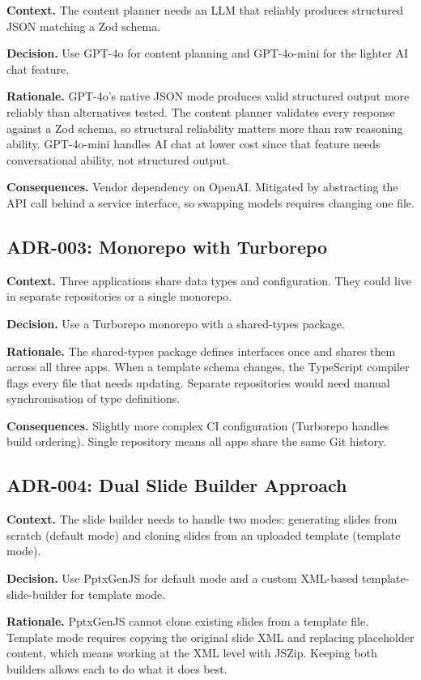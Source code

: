 \textbf{Context.} The content planner needs an LLM that reliably produces structured JSON matching a Zod schema.

\textbf{Decision.} Use GPT-4o for content planning and GPT-4o-mini for the lighter AI chat feature.

\textbf{Rationale.} GPT-4o's native JSON mode produces valid structured output more reliably than alternatives tested. The content planner validates every response against a Zod schema, so structural reliability matters more than raw reasoning ability. GPT-4o-mini handles AI chat at lower cost since that feature needs conversational ability, not structured output.

\textbf{Consequences.} Vendor dependency on OpenAI. Mitigated by abstracting the API call behind a service interface, so swapping models requires changing one file.

\subsection*{ADR-003: Monorepo with Turborepo}

\textbf{Context.} Three applications share data types and configuration. They could live in separate repositories or a single monorepo.

\textbf{Decision.} Use a Turborepo monorepo with a shared-types package.

\textbf{Rationale.} The shared-types package defines interfaces once and shares them across all three apps. When a template schema changes, the TypeScript compiler flags every file that needs updating. Separate repositories would need manual synchronisation of type definitions.

\textbf{Consequences.} Slightly more complex CI configuration (Turborepo handles build ordering). Single repository means all apps share the same Git history.

\subsection*{ADR-004: Dual Slide Builder Approach}

\textbf{Context.} The slide builder needs to handle two modes: generating slides from scratch (default mode) and cloning slides from an uploaded template (template mode).

\textbf{Decision.} Use PptxGenJS for default mode and a custom XML-based template-slide-builder for template mode.

\textbf{Rationale.} PptxGenJS cannot clone existing slides from a template file. Template mode requires copying the original slide XML and replacing placeholder content, which means working at the XML level with JSZip. Keeping both builders allows each to do what it does best.

